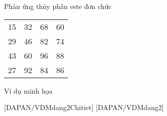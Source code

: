 \begin{dangntd}{Phản ứng thủy phân este đơn chức}
\begin{notegsnd}
\begin{tabular}{|L{0.2\textwidth}L{0.2\textwidth}L{0.2\textwidth}L{0.2\textwidth}|}
  15 &   32  &  68 &   60\\
  29 &   46  &  82 &   74\\
  43 &   60  &  96 &   88\\ 		
  27 &   92  &  84 &   86\\ 
  	  \hline	
	\end{tabular}
\end{notegsnd}
\end{dangntd}
\newpage
{}
\begin{vdm}{Ví dụ minh họa}
	
\end{vdm}

[DAPAN/VDMdang2Chitiet]
[DAPAN/VDMdang2]

